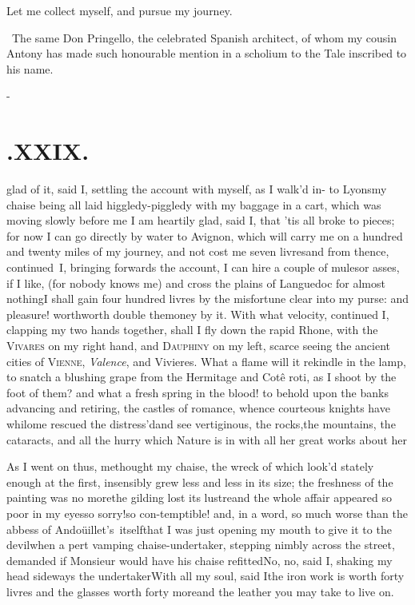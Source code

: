 \documentclass{article}
\begin{document}
\tsh Let me collect myself, and pursue my journey.

\bigskip
\bgroup\footnotesize
\indent\fnast\ The same Don Pringello, the
celebrated Spa\-nish architect, of whom my cousin Antony has\break
made such honourable mention in a scholium to\break
the Tale inscribed to his name.\\\par
\egroup

\vfill{}\eject
\null\kern-\baselineskip
\section{.\enspace XXIX.}

 glad of it, said I, settling the account with myself, as I
walk’d in-\break
to Lyons\tsh my chaise being all laid higgledy-piggledy
with my baggage in a cart, which was moving slowly before me\tsh
I am heartily glad, said I, that ’tis all broke to pieces; for
now I can go directly by water to Avignon, which will carry me
on a hundred and twenty miles of my journey, and not cost me
seven livres\tsh and from thence, continued~I, bringing forwards
the account, I can hire a couple of mules\tsk or asses, if I
like, (for nobody knows me) and cross the plains of Languedoc
for almost nothing\tsh I shall gain four hundred livres by the
misfortune clear into my purse: and pleasure! worth\tsk worth
double the\break money by it. With what velocity, continued I,
clapping my two hands toge\-ther, shall I fly down the rapid
Rhone, with the \textsc{Vivares} on my right hand, and
\textsc{Dauphiny} on my left, scarce seeing the ancient cities
of \textsc{Vienne}, \textit{Valence}, and Vivieres. What a flame
will it rekindle in the lamp, to snatch a blushing grape from
the Hermitage and Cotê roti, as I shoot by the foot of them? and
what a fresh spring in the blood!  to behold upon the banks
advancing and retiring, the castles of romance, whence courteous
knights have whilome rescued the distress’d\tsh and see
vertiginous, the rocks,\break the mountains, the cataracts, and all
the hurry which Nature is in with all her great works about
her\tsh{}

As I went on thus, methought my chaise, the wreck of which look’d stately
enough at the first, insensibly grew less and less in its size; the freshness
of the painting was no more\tsk the gilding lost its lustre\tsk and the
whole affair appeared so poor in my eyes\tsk so sorry!\tsk so
con-\break temptible!
and, in a word, so much worse than the abbess of Andoüillet’s\sic\ 
itself\tsk that I was just opening my mouth to give it to the
devil\tsk when a pert vamping chaise-undertaker, stepping nimbly across the
street, demanded if Monsieur would have his chaise refitted\tsk No,
no, said I, shaking my head sideways\tsk{}
the undertaker\tsk With all my soul, said\break
I\tsk the iron work is worth forty livres\tsk\break
and the glasses worth forty more\tsk and the leather
you may take to live on.
\end{document}

